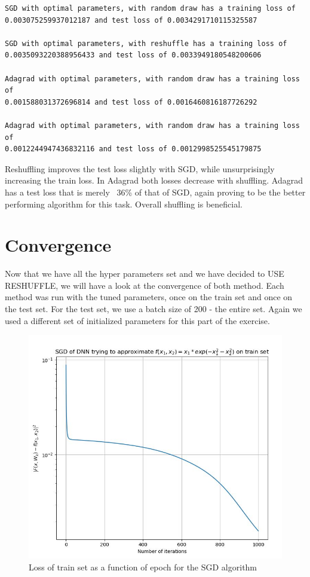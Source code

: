\documentclass[12pt]{scrartcl}
\begin{document}
\begin{verbatim}
SGD with optimal parameters, with random draw has a training loss of 
0.003075259937012187 and test loss of 0.0034291710115325587

SGD with optimal parameters, with reshuffle has a training loss of 
0.0035093220388956433 and test loss of 0.0033949180548200606

Adagrad with optimal parameters, with random draw has a training loss of 
0.001588031372696814 and test loss of 0.0016460816187726292

Adagrad with optimal parameters, with random draw has a training loss of 
0.0012244947436832116 and test loss of 0.0012998525545179875
\end{verbatim}
Reshuffling improves the test loss slightly with SGD, while unsurprisingly increasing the train loss. In Adagrad both losses decrease with shuffling. Adagrad has a test loss that is merely ~36\% of that of SGD, again proving to be the better performing algorithm for this task. Overall shuffling is beneficial.

\section{Convergence}
Now that we have all the hyper parameters set and we have decided to USE RESHUFFLE, we will have a look at the convergence of both method. Each method was run with the tuned parameters, once on the train set and once on the test set. For the test set, we use a batch size of 200 - the entire set. Again we used a different set of initialized parameters for this part of the exercise.\\

\begin{figure}[H]
	\hfill\includegraphics{SGD_train_convergence.jpg}\hspace*{\fill}
	\caption{Loss of train set as a function of epoch for the SGD algorithm}
\end{figure}
\end{document}
